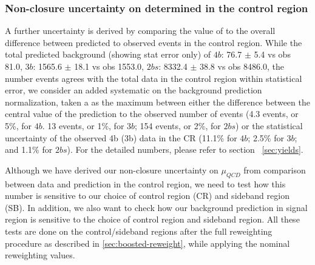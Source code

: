 
\subsubsection{Non-closure uncertainty on \muqcd determined in the control region}
\label{sec:non-closure-mu-qcd}

A further uncertainty is derived by comparing the value of \muqcd to the overall difference between predicted to observed events in the control region. While the total predicted background (showing stat error only) of $4b$: 76.7 $\pm$ 5.4 vs obs 81.0, $3b$: 1565.6 $\pm$ 18.1 vs obs 1553.0, $2bs$: 8332.4 $\pm$ 38.8 vs obs 8486.0, the number events agrees with the total data in the control region within statistical error, we consider an added systematic on the background prediction normalization, taken a as the maximum between either the difference between the central value of the prediction to the observed number of events (4.3 events, or 5\%, for $4b$.  13 events, or 1\%, for $3b$; 154 events, or 2\%, for $2bs$) or the statistical uncertainty of the observed 4b (3b) data in the CR (11.1\% for $4b$; 2.5\% for $3b$; and 1.1\% for $2bs$). For the detailed numbers, please refer to section ~\ref{sec:yields}. 

Although we have derived our non-closure uncertainty on $\mu_{QCD}$ from comparison between data and prediction in the control region, we need to test how this number is sensitive to our choice of control region (CR) and sideband region (SB). In addition, we also want to check how our background prediction in signal region is sensitive to the choice of control region and sideband region. All these tests are done on the control/sideband regions after the full reweighting procedure as described in \ref{sec:boosted-reweight}, while applying the nominal reweighting values.

